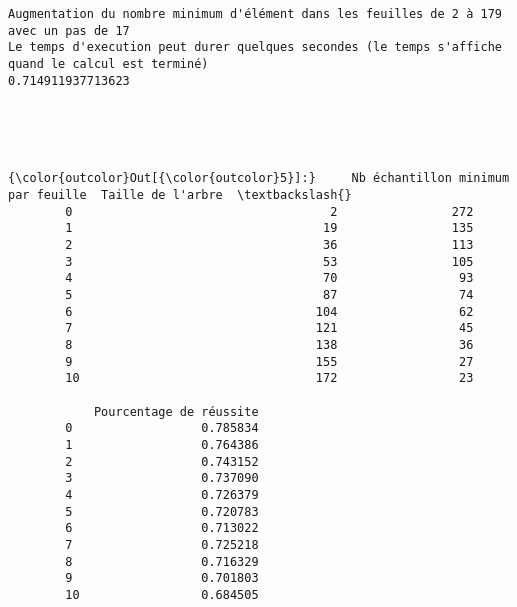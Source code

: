 \documentclass[11pt]{article}
\begin{document}
    \begin{Verbatim}[commandchars=\\\{\}]
Augmentation du nombre minimum d'élément dans les feuilles de 2 à 179 avec un pas de 17
Le temps d'execution peut durer quelques secondes (le temps s'affiche quand le calcul est terminé)
0.714911937713623

    \end{Verbatim}

    \begin{center}
    \end{center}
    { \hspace*{\fill} \\}
    
    \begin{center}
    \end{center}
    { \hspace*{\fill} \\}
    
\begin{Verbatim}[commandchars=\\\{\}]
{\color{outcolor}Out[{\color{outcolor}5}]:}     Nb échantillon minimum par feuille  Taille de l'arbre  \textbackslash{}
        0                                    2                272   
        1                                   19                135   
        2                                   36                113   
        3                                   53                105   
        4                                   70                 93   
        5                                   87                 74   
        6                                  104                 62   
        7                                  121                 45   
        8                                  138                 36   
        9                                  155                 27   
        10                                 172                 23   
        
            Pourcentage de réussite  
        0                  0.785834  
        1                  0.764386  
        2                  0.743152  
        3                  0.737090  
        4                  0.726379  
        5                  0.720783  
        6                  0.713022  
        7                  0.725218  
        8                  0.716329  
        9                  0.701803  
        10                 0.684505  
\end{Verbatim}
            
\end{document}
